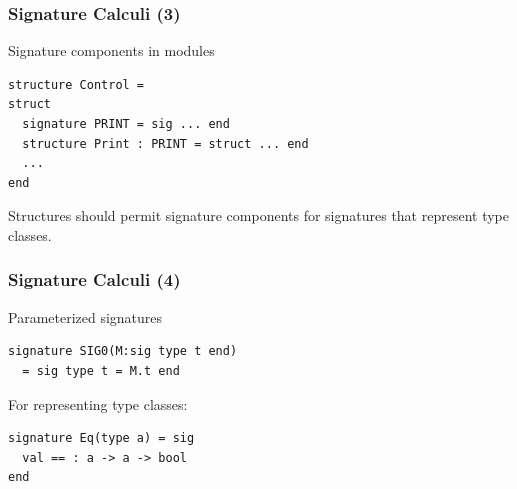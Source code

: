 \documentclass{beamer}
\begin{document}

\begin{frame}[fragile]
\frametitle{Signature Calculi (3)}
\begin{block}{Signature components in modules}
\begin{lstlisting}
structure Control = 
struct 
  signature PRINT = sig ... end 
  structure Print : PRINT = struct ... end 
  ... 
end
\end{lstlisting}
Structures should permit signature components for signatures that represent type classes. 
\end{block}
\end{frame}


\begin{frame}[fragile]
\frametitle{Signature Calculi (4)}
\begin{block}{Parameterized signatures}
\begin{lstlisting}
signature SIG0(M:sig type t end) 
  = sig type t = M.t end
\end{lstlisting}
\end{block}
For representing type classes: 
\begin{lstlisting}
signature Eq(type a) = sig
  val == : a -> a -> bool
end	
\end{lstlisting}
\end{frame}
\end{document}
